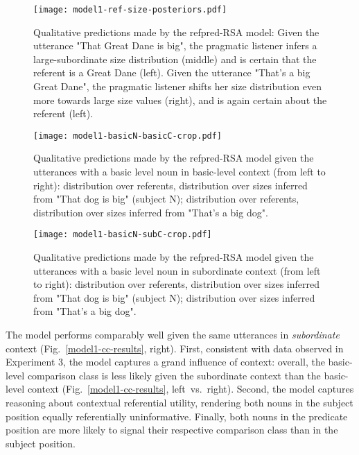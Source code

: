 \begin{figure*}[t]
	\begin{center}
		\texttt{[image: model1-ref-size-posteriors.pdf]}
	\end{center}
	\vspace{-0.3cm}
	\caption{Qualitative predictions made by the refpred-RSA model: Given the utterance "That Great Dane is big", the pragmatic listener infers a large-subordinate size distribution (middle) and is certain that the referent is a Great Dane (left). Given the utterance "That's a big Great Dane", the pragmatic listener shifts her size distribution even more towards large size values (right), and is again certain about the referent (left).}
	\label{model1-ref-size-results}
\end{figure*}
\begin{figure*}[h]
	\begin{center}
		\texttt{[image: model1-basicN-basicC-crop.pdf]}
	\end{center}
	\vspace{-0.3cm}
	\caption{Qualitative predictions made by the refpred-RSA model given the utterances with a basic level noun in basic-level context (from left to right): distribution over referents, distribution over sizes inferred from "That dog is big" (subject N); distribution over referents, distribution over sizes inferred from "That's a big dog".}
	\label{model1-basicN-basicC}
\end{figure*}
\begin{figure*}[b]
	\begin{center}
		\texttt{[image: model1-basicN-subC-crop.pdf]}
	\end{center}
	\vspace{-0.3cm}
	\caption{Qualitative predictions made by the refpred-RSA model given the utterances with a basic level noun in subordinate context (from left to right): distribution over referents, distribution over sizes inferred from "That dog is big" (subject N); distribution over sizes inferred from "That's a big dog".}
	\label{model1-basicN-subC}
\end{figure*}

The model performs comparably well given the same utterances in \emph{subordinate} context (Fig.~\ref{model1-cc-results}, right). First, consistent with data observed in Experiment 3, the model captures a grand influence of context: overall, the basic-level comparison class is less likely given the subordinate context than the basic-level context (Fig.~\ref{model1-cc-results}, left~vs.~right). Second, the model captures reasoning about contextual referential utility, rendering both nouns in the subject position equally referentially uninformative. Finally, both nouns in the predicate position are more likely to signal their respective comparison class than in the subject position.

